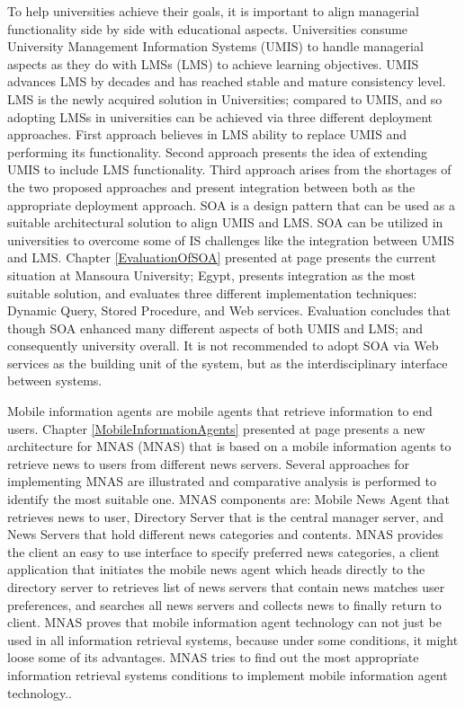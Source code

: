 \documentclass[12pt,a4paper,final,twoside,onecolumn,titlepage]{book}
\begin{document}
To help universities achieve their goals, it is important to align managerial functionality side by side with educational aspects. Universities consume University Management Information Systems (\gls{UMIS}) to handle managerial aspects as they do with \gls{LMS}s (\gls{LMS}) to achieve learning objectives. \gls{UMIS} advances \gls{LMS} by decades and has reached stable and mature consistency level. \gls{LMS} is the newly acquired solution in Universities; compared to \gls{UMIS}, and so adopting \gls{LMS}s in universities can be achieved via three different deployment approaches. First approach believes in \gls{LMS} ability to replace \gls{UMIS} and performing its functionality. 
Second approach presents the idea of extending \gls{UMIS} to include \gls{LMS} functionality. Third approach arises from the shortages of the two proposed approaches and present integration between both as the appropriate deployment approach. \gls{SOA} is a design pattern that can be used as a suitable architectural solution to align \gls{UMIS} and \gls{LMS}. \gls{SOA} can be utilized in universities to overcome some of \gls{IS} challenges like the integration between \gls{UMIS} and \gls{LMS}. 
Chapter \ref{EvaluationOfSOA} presented at page \pageref{EvaluationOfSOA} presents the current situation at Mansoura University; Egypt, presents integration as the most suitable solution, and evaluates three different implementation techniques: Dynamic Query, Stored Procedure, and Web services. Evaluation concludes that though \gls{SOA} enhanced many different aspects of both \gls{UMIS} and \gls{LMS}; and consequently university overall. It is not recommended to adopt \gls{SOA} via Web services as the building unit of the system, but as the interdisciplinary interface between systems.

Mobile information agents are mobile agents that retrieve information to end users. Chapter \ref{MobileInformationAgents} presented at page \pageref{MobileInformationAgents} presents a new architecture for \gls{MNAS} (\gls{MNAS}) that is based on a mobile information agents to retrieve news to users from different news servers. Several approaches for implementing \gls{MNAS} are illustrated and comparative analysis is performed to identify the most suitable one. \gls{MNAS} components are: Mobile News Agent that retrieves news to user, Directory Server that is the central manager server, and News Servers that hold different news categories and contents. \gls{MNAS} provides the client an easy to use interface to specify preferred news categories, a client application that initiates the mobile news agent which heads directly to the directory server to retrieves list of news servers that contain news matches user preferences, and searches all news servers and collects news to finally return to client. \gls{MNAS} proves that mobile information agent technology can not just be used in all information retrieval systems, because under some conditions, it might loose some of its advantages. \gls{MNAS} tries to find out the most appropriate information retrieval systems conditions to implement mobile information agent technology..
\end{document}
